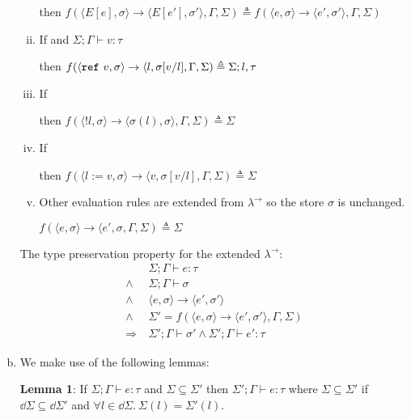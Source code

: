\begin{enumerate}[(a)]
\begin{enumerate}[i.]
  then $f(
  \langle E[e], \sigma \rangle \rightarrow \langle E[e'], \sigma' \rangle,
  \Gamma, 
  \Sigma) \triangleq f(
  \langle e, \sigma \rangle \rightarrow \langle e', \sigma' \rangle,
  \Gamma, 
  \Sigma)$

\item If  and $\Sigma; \Gamma \vdash v : \tau$

  then $f(
  \langle \texttt{ref}~v, \sigma \rangle \rightarrow \langle l, \sigma[v/l],
  \Gamma, 
  \Sigma) \triangleq 
  \Sigma; l, \tau$

\item If 

  then $f(
  \langle !l, \sigma \rangle \rightarrow \langle \sigma(l), \sigma \rangle,
  \Gamma, 
  \Sigma) \triangleq \Sigma$

\item If 

  then $f(
  \langle l := v, \sigma \rangle \rightarrow \langle v, \sigma[v/l],
  \Gamma, 
  \Sigma) \triangleq \Sigma$

\item Other evaluation rules are extended from $\lambda^{\rightarrow}$ so the store $\sigma$ is unchanged.

  $f(
  \langle e, \sigma \rangle \rightarrow \langle e', \sigma,
  \Gamma, 
  \Sigma) \triangleq \Sigma$
\end{enumerate}

The type preservation property for the extended $\lambda^{\rightarrow}$:
\begin{align*}
&\Sigma;\Gamma \vdash e : \tau \\
\wedge~&\Sigma;\Gamma \vdash \sigma\\
\wedge~&\langle e, \sigma \rangle \rightarrow \langle e', \sigma' \rangle\\
\wedge~&\Sigma' = f(\langle e, \sigma \rangle \rightarrow \langle e', \sigma' \rangle, \Gamma, \Sigma)\\
\Longrightarrow~&\Sigma';\Gamma \vdash \sigma' \wedge \Sigma';\Gamma \vdash e' : \tau
\end{align*}
\item We make use of the following lemmas:

\textbf{Lemma 1}: If $\Sigma;\Gamma \vdash e : \tau$ and $\Sigma \subseteq \Sigma'$ then $\Sigma';\Gamma \vdash e : \tau$ where $\Sigma \subseteq \Sigma'$ if $\dd \Sigma \subseteq \dd \Sigma'$ and $\forall l \in \dd \Sigma. ~ \Sigma(l) = \Sigma'(l)$.


\end{enumerate}
